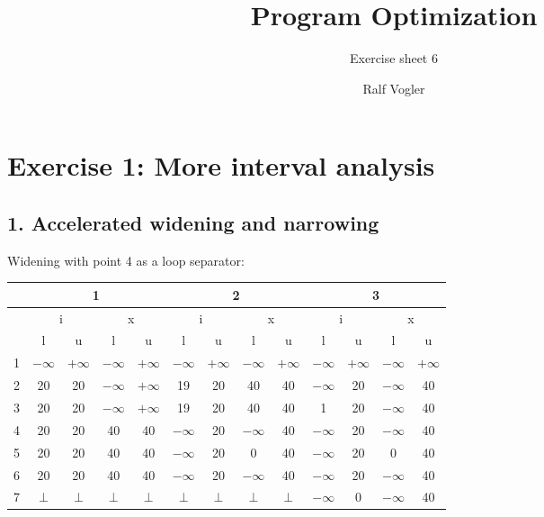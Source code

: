 \documentclass[11pt,a4paper]{scrartcl}
\begin{document}
\author{Ralf Vogler}
\title{Program Optimization}
\subtitle{Exercise sheet 6}

\maketitle

\section*{Exercise 1: More interval analysis}
\subsection*{1. Accelerated widening and narrowing}
Widening with point 4 as a loop separator:\\
\begin{tabular}{|c||cc|cc||cc|cc||cc|cc||}
\hline
 & \multicolumn{4}{|c|}{1} & \multicolumn{4}{|c|}{2} & \multicolumn{4}{|c|}{3} \\
\hline
\hline
 & \multicolumn{2}{|c|}{i} & \multicolumn{2}{|c|}{x} & \multicolumn{2}{|c|}{i} & \multicolumn{2}{|c|}{x} & \multicolumn{2}{|c|}{i} & \multicolumn{2}{|c|}{x} \\
 & l & u & l & u & l & u & l & u & l & u & l & u \\
\hline
1 & $-\infty$ & $+\infty$ & $-\infty$ & $+\infty$ & $-\infty$ & $+\infty$ & $-\infty$ & $+\infty$ & $-\infty$     & $+\infty$ & $-\infty$  & $+\infty$ \\
2 & 20		  & 20		  & $-\infty$ & $+\infty$ & 19		  & 20		  &	40	      & 40		  &	$-\infty$	  & 20		  &	$-\infty$  & 40 \\
3 & 20		  & 20		  & $-\infty$ & $+\infty$ & 19		  & 20		  &	40  	  & 40		  &	1	          & 20		  &	$-\infty$  & 40 \\
4 & 20		  & 20		  & 40		  & 40		  & $-\infty$ & 20		  &	$-\infty$ & 40		  &	$-\infty$	  & 20		  &	$-\infty$  & 40 \\
5 & 20		  & 20		  & 40		  & 40		  & $-\infty$ & 20		  &	0	      & 40		  &	$-\infty$	  & 20		  &	0	       & 40 \\
6 & 20		  & 20		  & 40		  & 40		  & $-\infty$ & 20		  &	$-\infty$ & 40		  &	$-\infty$	  & 20		  &	$-\infty$  & 40 \\
7 & $\bot$	  & $\bot$	  & $\bot$	  & $\bot$	  & $\bot$	  & $\bot$    &	$\bot$    & $\bot$    &	$-\infty$	  & 0		  &	$-\infty$      & 40 \\
\hline
\end{tabular}\\
\end{document}
